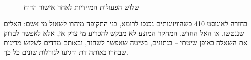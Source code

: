 \begin{figure}[htbp]
  \centering
  
  \caption{שלוש הפעולות המיידיות לאחר אישור הדוח}
  \label{fig:next-steps}
\end{figure}

\begin{keybox}{בחזרה לאוגוסט 410}
כשהוויזיגותים נכנסו לרומא, בני התקופה מיהרו לשאול מי אשם: האלים שננטשו, או האל החדש. המחקר המוצע לא מבקש להכריע מי צדק אז, אלא לאפשר לבדוק את השאלה באופן שיטתי – בנתונים, בשיטה שאפשר לשחזר, ובאותם מדדים לשלוש מדינות שבחרו באותה דת והגיעו לגורלות שונים כל כך.
\end{keybox}
